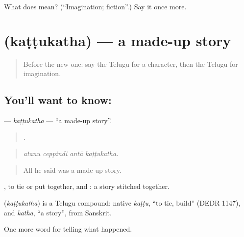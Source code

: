 \begin{tcolorbox}[breakable,colback=teal!4,colframe=teal!35!black,title={Before you move on}]
What does  mean? (\textquotedblleft{}Imagination; fiction\textquotedblright{}.) Say it once more.
\end{tcolorbox}
\section[\texorpdfstring{\te{కట్టుకథ} (kaṭṭukatha)}{కట్టుకథ (kaṭṭukatha)}]{ (kaṭṭukatha) — a made-up story}

\label{lesson:TE-C372-kattukatha}



\begin{quote}
Before the new one: say the Telugu for a character, then the Telugu for imagination.
\end{quote}

\subsection*{You'll want to know: }
\textbf{} — \emph{kaṭṭukatha} — \textquotedblleft{}a made-up story\textquotedblright{}.

\begin{quote}
   .
\end{quote}

\begin{quote}
\emph{atanu ceppindi antā kaṭṭukatha.}
\end{quote}

\begin{quote}
All he said was a made-up story.
\end{quote}

, to tie or put together, and : a story stitched together.

\begin{cousinweb}
\textbf{} (\emph{kaṭṭukatha}) is a Telugu compound: native \emph{kaṭṭu}, \textquotedblleft{}to tie, build\textquotedblright{} (DEDR 1147), and \emph{katha}, \textquotedblleft{}a story\textquotedblright{}, from Sanskrit.
\end{cousinweb}

\begin{grammarlens}[title={What you've built}]
One more word for telling what happened.
\end{grammarlens}

